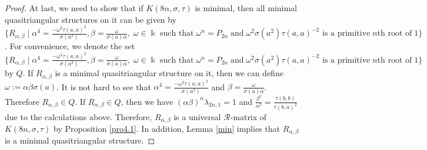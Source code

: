 \documentclass[a4paper,11pt]{amsart}
\numberwithin{equation}{section}
\begin{document}
\begin{proof}
 At last, we need to show that if $K(8n,\sigma,\tau)$ is minimal, then all minimal quasitriangular structures on it can be given by
 $\{R_{\alpha,\beta}\;|\; \alpha^4=\frac{-\omega^2\tau(a,a)^2}{\sigma(a^2)}, \beta=\frac{\omega}{\sigma(a)\alpha},\;\omega \in \Bbbk \; \text{such that}\; \omega^n=P_{2n} \;\text{and} \; \omega^2 \sigma(a^2) \tau(a,a)^{-2} \text{ is a primitive} \;n\text{th root of}\;1\}$. For convenience, we denote the set $\{R_{\alpha,\beta}\;|\; \alpha^4=\frac{-\omega^2\tau(a,a)^2}{\sigma(a^2)}, \beta=\frac{\omega}{\sigma(a)\alpha},\;\omega \in \Bbbk \; \text{such that}\; \omega^n=P_{2n} \;\text{and} \; \omega^2 \sigma(a^2) \tau(a,a)^{-2} \text{ is a primitive} \;n\text{th root of}\;1\}$ by $Q$. If $R_{\alpha,\beta}$ is a minimal quasitriangular structure on it, then we can define
 $\omega:=\alpha\beta\sigma(a)$. It is not hard to see that  $\alpha^4=\frac{-\omega^2\tau(a,a)^2}{\sigma(a^2)}$ and $\beta=\frac{\omega}{\sigma(a)\alpha}$. Therefore $R_{\alpha,\beta} \in Q$. If $R_{\alpha,\beta} \in Q$, then we have $(\alpha\beta)^n \lambda_{2n,1}=1$ and $\frac{\beta^2}{\alpha^2}=\frac{\tau(b,b)}{\tau(b,a)^2}$ due to the calculations above. Therefore, $R_{\alpha,\beta}$ is a universal $\mathcal{R}$-matrix of $K(8n,\sigma,\tau)$ by Proposition \ref{pro4.1}. In addition, Lemma \ref{min} implies that $R_{\alpha,\beta}$ is a minimal quasitriangular structure.


\end{proof}
\end{document}
